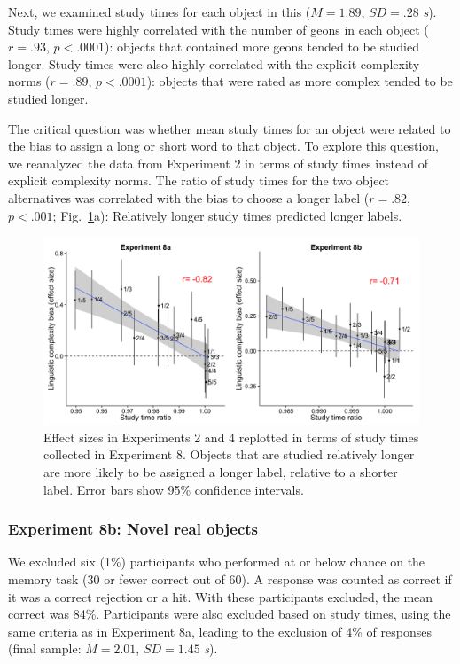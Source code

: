 Next, we examined study times for each object in this ($M = 1.89$, $SD = .28$ {\it s}). Study times were highly correlated with the number of geons in each object ($r=.93$, $p<.0001$): objects that contained more geons tended to be studied longer. Study times were also highly correlated with the explicit complexity norms ($r = .89$, $p < .0001$): objects that were rated as more complex tended to be studied longer.

The critical question was whether mean study times for an object were related to the bias to assign a long or short word to that object. To explore this question, we reanalyzed the data from Experiment 2 in terms of study times instead of explicit complexity norms. The ratio of study times for the two object alternatives was correlated with the bias to choose a longer label ($r = .82$, $p < .001$; Fig.\ \ref{fig:study3_plots}a): Relatively longer study times predicted longer labels.

 \begin{figure}
 \begin{center}
  \includegraphics[width=6in]{figs/study3_plots.png}
  \caption{\label{fig:study3_plots} Effect sizes in Experiments 2 and 4 replotted in terms of study times collected in Experiment 8. Objects that are studied relatively longer are more likely to be assigned a longer label, relative to a shorter label. Error bars show 95\% confidence intervals.}
 \end{center}
\end{figure}

\subsubsection{Experiment 8b: Novel real objects}
\label{ch2-8b}
We excluded six (1\%) participants who performed at or below chance on the memory task (30 or fewer correct out of 60). A response was counted as correct if it was a correct rejection or a hit. With these participants excluded, the mean correct was 84\%. Participants were also excluded based on study times, using the same criteria as in Experiment 8a, leading to the exclusion of 4\% of responses (final sample: $M = 2.01$, $SD = 1.45$ {\it s}).

